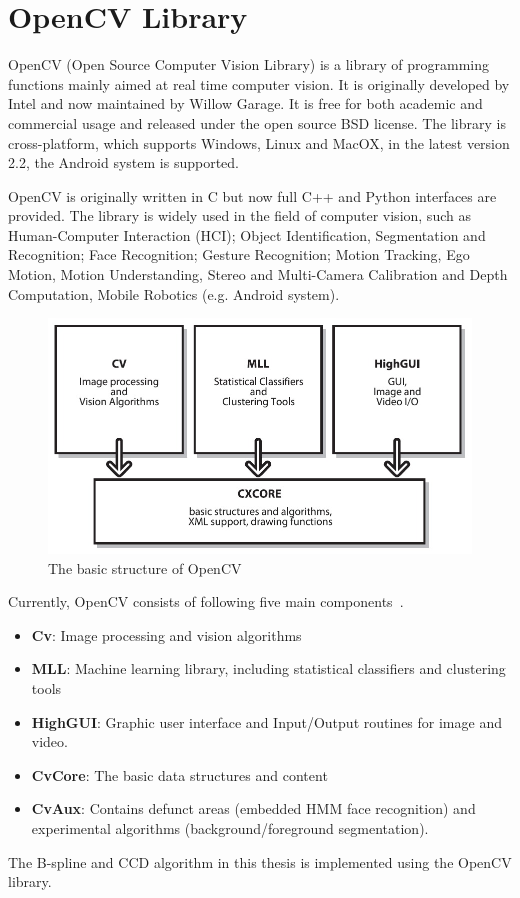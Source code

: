 \section{OpenCV Library}
\label{sec:opencv}

OpenCV (Open Source Computer Vision Library) is a library of
programming functions mainly aimed at real time computer vision. It is
originally developed by Intel and now maintained by Willow Garage. It
is free for both academic and commercial usage and released  under the
open source BSD license. The library is cross-platform, which supports
Windows, Linux and MacOX,  in the latest version 2.2, the Android
system is supported.

OpenCV is originally written in C but now full C++ and Python
interfaces are provided. The library is widely used in the field of
computer vision, such as Human-Computer Interaction (HCI); Object
Identification, Segmentation and Recognition; Face Recognition;
Gesture Recognition; Motion Tracking, Ego Motion, Motion
Understanding, Stereo and Multi-Camera
Calibration and Depth Computation, Mobile Robotics (e.g. Android
system).

\begin{figure}[htbp]
  \centering
\includegraphics[width=\linewidth]{images/bsopencv.jpg}
  \caption{The basic structure of OpenCV~\cite{bradski2008learning}}
  \label{fig:bsopencv}
\end{figure}

Currently, OpenCV consists of following five main components~\cite{bradski2008learning}.
\begin{itemize}
\item \textbf{Cv}: Image processing and vision algorithms
\item \textbf{MLL}: Machine learning library, including statistical classifiers and clustering tools
\item \textbf{HighGUI}: Graphic user interface and Input/Output
  routines for image and video.
\item \textbf{CvCore}: The basic data structures and content
\item \textbf{CvAux}: Contains defunct areas (embedded HMM face
  recognition) and experimental algorithms (background/foreground
  segmentation).
\end{itemize}

The B-spline and CCD algorithm in this thesis is implemented using the
OpenCV library.
